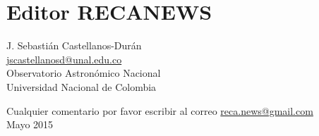 			\section*{Editor RECANEWS}
  
\begin{flushright}
J. Sebastián Castellanos-Durán\\
\url{jscastellanosd@unal.edu.co}\\
Observatorio Astronómico Nacional\\
Universidad Nacional de Colombia
\end{flushright}
\begin{flushright}
Cualquier comentario por favor escribir al correo  \url{reca.news@gmail.com}\\
Mayo 2015
\end{flushright}


